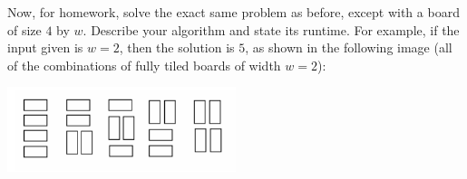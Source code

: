 \documentclass[10pt]{article}
\begin{document}
Now, for homework, solve the exact same problem as before, except with a board of size $4$ by $w$. Describe your algorithm and state its runtime. For example, if the input given is $w=2$, then the solution is $5$, as shown in the following image (all of the combinations of fully tiled boards of width $w=2$):

{\centering
\includegraphics[width=0.5\textwidth]{Dominoes.png}
}

\solution{
}


\end{document}

